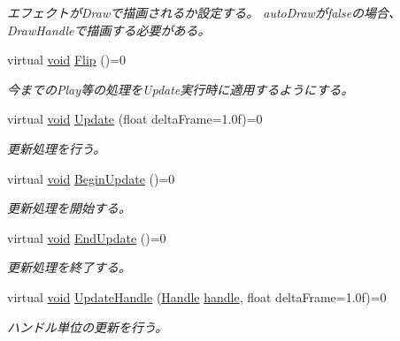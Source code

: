 \begin{DoxyCompactItemize}
\begin{DoxyCompactList}\small\item\em エフェクトが\+Drawで描画されるか設定する。 auto\+Drawがfalseの場合、\+Draw\+Handleで描画する必要がある。 \end{DoxyCompactList}\item 
virtual \mbox{\hyperlink{namespace_effekseer_ab34c4088e512200cf4c2716f168deb56}{void}} \mbox{\hyperlink{class_effekseer_1_1_manager_ab810f714df5d12c566664183f365cbf4}{Flip}} ()=0
\begin{DoxyCompactList}\small\item\em 今までの\+Play等の処理を\+Update実行時に適用するようにする。 \end{DoxyCompactList}\item 
virtual \mbox{\hyperlink{namespace_effekseer_ab34c4088e512200cf4c2716f168deb56}{void}} \mbox{\hyperlink{class_effekseer_1_1_manager_ac086ec64cb5f99172e8bf655b77e1464}{Update}} (float delta\+Frame=1.\+0f)=0
\begin{DoxyCompactList}\small\item\em 更新処理を行う。 \end{DoxyCompactList}\item 
virtual \mbox{\hyperlink{namespace_effekseer_ab34c4088e512200cf4c2716f168deb56}{void}} \mbox{\hyperlink{class_effekseer_1_1_manager_a8b9585b3bee11d4d0d7b29b742178f96}{Begin\+Update}} ()=0
\begin{DoxyCompactList}\small\item\em 更新処理を開始する。 \end{DoxyCompactList}\item 
virtual \mbox{\hyperlink{namespace_effekseer_ab34c4088e512200cf4c2716f168deb56}{void}} \mbox{\hyperlink{class_effekseer_1_1_manager_a49311566caa5abcbff1b836473b046ab}{End\+Update}} ()=0
\begin{DoxyCompactList}\small\item\em 更新処理を終了する。 \end{DoxyCompactList}\item 
virtual \mbox{\hyperlink{namespace_effekseer_ab34c4088e512200cf4c2716f168deb56}{void}} \mbox{\hyperlink{class_effekseer_1_1_manager_afe8a0df796e161f68a511540c76df839}{Update\+Handle}} (\mbox{\hyperlink{namespace_effekseer_afba58b8d812da862190e9bbfc040824a}{Handle}} \mbox{\hyperlink{namespace_effekseer_afd99b336b206999bdcca3e431648efbc}{handle}}, float delta\+Frame=1.\+0f)=0
\begin{DoxyCompactList}\small\item\em ハンドル単位の更新を行う。 \end{DoxyCompactList}\item 

\end{DoxyCompactItemize}
